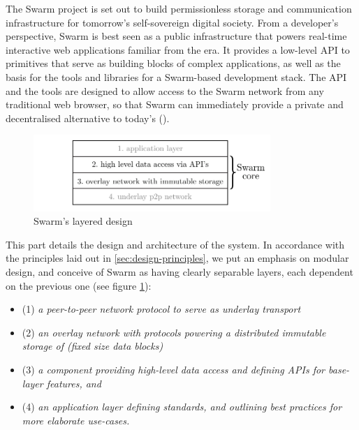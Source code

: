 
\green{}

The Swarm project is set out to build permissionless storage and communication infrastructure for tomorrow's self-sovereign digital society. From a developer's perspective, Swarm is best seen as a public infrastructure that powers real-time interactive web applications familiar from the  era. It provides a low-level API to primitives that serve as building blocks of complex applications, as well as the basis for the tools and libraries for a Swarm-based  development stack. The API and the tools are designed to allow access to the Swarm network from any traditional web browser, so that Swarm can immediately provide a private and decentralised alternative to today's  ().

\begin{figure}[htbp]
  \centering
    \includegraphics[width=0.8\textwidth]{fig/swarm-layered-design.pdf}
  \caption[Swarm's layered design \statusgreen]{Swarm's layered design}
\label{fig:Swarm-layered-design}
\end{figure}

This part details the design and architecture of the system. In accordance with the principles laid out in \ref{sec:design-principles}, we put an emphasis on modular design, and conceive of Swarm as having clearly separable layers, each dependent on the previous one (see figure \ref{fig:Swarm-layered-design}):

\begin{itemize}
\item (1) \emph{a peer-to-peer network protocol to serve as underlay transport}
\item (2) \emph{an overlay network with protocols powering a distributed immutable storage of  (fixed size data blocks)}
\item (3) \emph{a component providing high-level data access and defining APIs for base-layer features, and}
\item (4) \emph{an application layer defining standards, and outlining best practices for more elaborate use-cases.}
\end{itemize}

